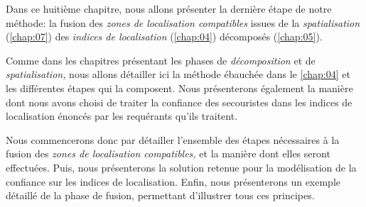 Dans ce huitième chapitre, nous allons présenter la dernière étape de
notre méthode: la fusion des \emph{zones de localisation compatibles}
issues de la \emph{spatialisation} (\autoref{chap:07}) des
\emph{indices de localisation} (\autoref{chap:04}) décomposés
(\autoref{chap:05}).

Comme dans les chapitres présentant les phases de \emph{décomposition}
et de \emph{spatialisation,} nous allons détailler ici la méthode
ébauchée dans le \autoref{chap:04} et les différentes étapes qui la
composent. Nous présenterons également la manière dont nous avons
choisi de traiter la confiance des secouristes dans les indices de
localisation énoncés par les requérants qu'ils traitent.

Nous commencerons donc par détailler l'ensemble des étapes nécessaires
à la fusion des \emph{zones de localisation compatibles,} et la
manière dont elles seront effectuées. Puis, nous présenterons la
solution retenue pour la modélisation de la confiance sur les indices
de localisation. Enfin, nous présenterons un exemple détaillé de la
phase de fusion, permettant d'illustrer tous ces principes.

